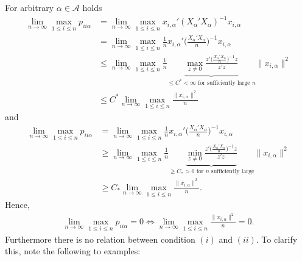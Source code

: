 \documentclass[Research_Module_ES.tex]{subfiles}
\begin{document}
For arbitrary $\alpha \in \mathcal{A}$ holds
\begin{align*}
\lim_{n\to\infty} \max_{1\le i\le n} p_{ii\alpha} &= \lim_{n\to\infty} \max_{1\le i\le n} x_{i,\alpha}'(X_\alpha'X_\alpha)^{-1} x_{i,\alpha} \\
&= \lim_{n\to\infty} \max_{1\le i\le n} \frac{1}{n} x_{i,\alpha}'\biggl(\frac{X_\alpha'X_\alpha}{n}\biggr)^{-1} x_{i,\alpha} \\
&\le \lim_{n\to\infty} \max_{1\le i\le n} \frac{1}{n} \underbrace{\max_{z\neq 0} \frac{z'\bigl(\frac{X_\alpha'X_\alpha}{n}\bigr)^{-1}z}{z'z}}_{\le C^\ast < \infty \textrm{ for sufficiently large $n$} }  \lVert x_{i,\alpha} \rVert ^2 \\
&\le C^\ast \lim_{n\to \infty} \max_{1\le i \le n} \frac{\lVert x_{i,\alpha}\rVert ^2}{n}
\end{align*}
and 
\begin{align*}
\lim_{n\to \infty} \max_{1\le i \le n} p_{ii\alpha} &=  \lim_{n\to\infty} \max_{1\le i\le n} \frac{1}{n} x_{i,\alpha}'\biggl(\frac{X_\alpha'X_\alpha}{n}\biggr)^{-1} x_{i,\alpha} \\
&\ge \lim_{n\to\infty} \max_{1\le i\le n} \frac{1}{n} \underbrace{\min_{z\neq 0} \frac{z'\bigl(\frac{X_\alpha'X_\alpha}{n}\bigr)^{-1}z}{z'z}}_{\ge C_\ast > 0 \textrm{ for $n$ sufficiently large}} \lVert x_{i,\alpha} \rVert ^2\\
&\ge C_\ast \lim_{n\to\infty} \max_{1\le i\le n} \frac{\lVert x_{i,\alpha}\rVert^2}{n}.
\end{align*}
Hence, 
\begin{align*}
\lim_{n\to \infty} \max_{1\le i \le n} p_{ii\alpha} = 0 \iff \lim_{n\to\infty} \max_{1\le i\le n} \frac{\lVert x_{i,\alpha}\rVert^2}{n} = 0.
\end{align*}
Furthermore there is no relation between condition $(i)$ and $(ii)$. To clarify this, note the following to examples:
\end{document}
